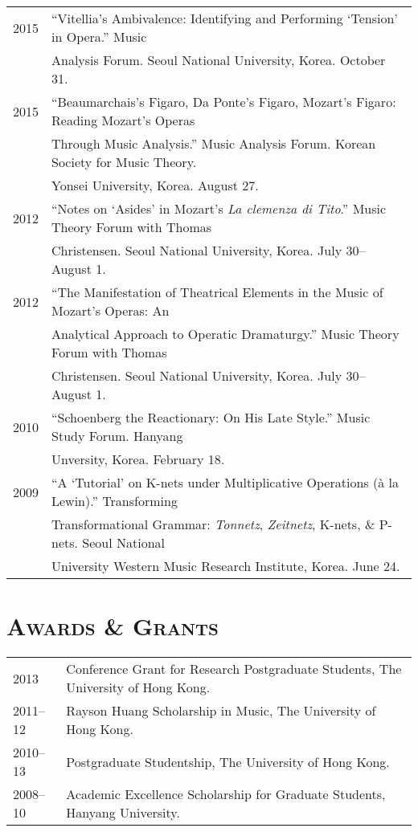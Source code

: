 \documentclass[a4paper,11pt,draft]{article}
\begin{document}
  \hspace*{-0.25cm}
  \begin{tabular}{p{2.5cm} p{12.5cm}}
  2015 & ``Vitellia’s Ambivalence: Identifying and Performing ‘Tension’ in Opera.'' Music\\
  & Analysis Forum. Seoul National University, Korea. October 31.\\[2mm]
  
  2015 & ``Beaumarchais's Figaro, Da Ponte's Figaro, Mozart's Figaro: Reading Mozart's Operas\\
  & Through Music Analysis.'' Music Analysis Forum. Korean Society for Music Theory.\\
  & Yonsei University, Korea. August 27.\\[2mm]
  
  2012 & “Notes on ‘Asides’ in Mozart’s \textit{La clemenza di Tito}.” Music Theory Forum with Thomas\\
  & Christensen. Seoul National University, Korea. July 30–August 1.\\[2mm]

  2012 & “The Manifestation of Theatrical Elements in the Music of Mozart’s Operas: An\\
  & Analytical Approach to Operatic Dramaturgy.” Music Theory Forum with Thomas\\
  & Christensen. Seoul National University, Korea. July 30–August 1.\\[2mm]

  2010 & “Schoenberg the Reactionary: On His Late Style.” Music Study Forum. Hanyang\\
  & Unversity, Korea. February 18.\\[2mm]
  
  2009 & “A ‘Tutorial’ on K-nets under Multiplicative Operations (à la Lewin).” Transforming\\
  & Transformational Grammar: \textit{Tonnetz}, \textit{Zeitnetz}, K-nets, \& P-nets. Seoul National\\
  & University Western Music Research Institute, Korea. June 24.
  \end{tabular}
  
  \vspace{5.0mm}
  
  \section*{\textsc{Awards \& Grants}}
  
  \hspace*{-0.25cm}
  \begin{tabular}{p{2.5cm} l}
    2013 & Conference Grant for Research Postgraduate Students, The University of Hong Kong.\\
    2011–12 & Rayson Huang Scholarship in Music, The University of Hong Kong.\\
    2010–13 & Postgraduate Studentship, The University of Hong Kong.\\
    2008–10 & Academic Excellence Scholarship for Graduate Students, Hanyang University.
  \end{tabular}
  
\end{document}

